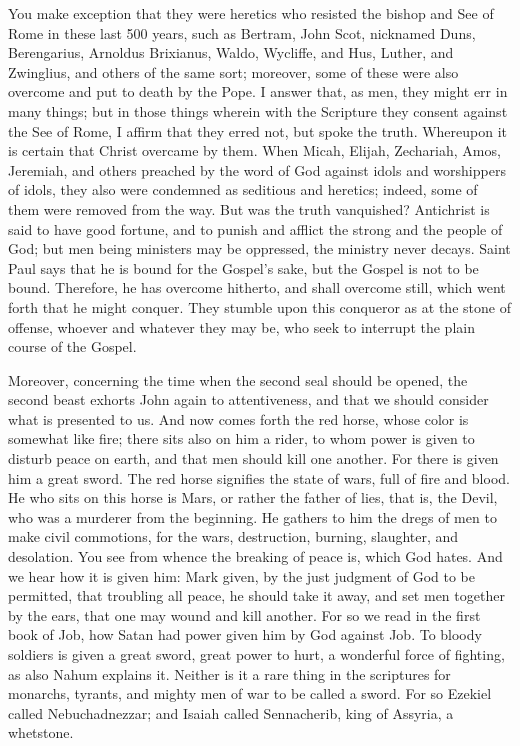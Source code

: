 You make exception that they were heretics who resisted the bishop and See of Rome in these last 500 years, such as Bertram, John Scot, nicknamed Duns, Berengarius, Arnoldus Brixianus, Waldo, Wycliffe, and Hus, Luther, and Zwinglius, and others of the same sort; moreover, some of these were also overcome and put to death by the Pope. I answer that, as men, they might err in many things; but in those things wherein with the Scripture they consent against the See of Rome, I affirm that they erred not, but spoke the truth. Whereupon it is certain that Christ overcame by them. When Micah, Elijah, Zechariah, Amos, Jeremiah, and others preached by the word of God against idols and worshippers of idols, they also were condemned as seditious and heretics; indeed, some of them were removed from the way. But was the truth vanquished? Antichrist is said to have good fortune, and to punish and afflict the strong and the people of God; but men being ministers may be oppressed, the ministry never decays. Saint Paul says that he is bound for the Gospel’s sake, but the Gospel is not to be bound. Therefore, he has overcome hitherto, and shall overcome still, which went forth that he might conquer. They stumble upon this conqueror as at the stone of offense, whoever and whatever they may be, who seek to interrupt the plain course of the Gospel.

Moreover, concerning the time when the second seal should be opened, the second beast exhorts John again to attentiveness, and that we should consider what is presented to us. And now comes forth the red horse, whose color is somewhat like fire; there sits also on him a rider, to whom power is given to disturb peace on earth, and that men should kill one another. For there is given him a great sword. The red horse signifies the state of wars, full of fire and blood. He who sits on this horse is Mars, or rather the father of lies, that is, the Devil, who was a murderer from the beginning. He gathers to him the dregs of men to make civil commotions, for the wars, destruction, burning, slaughter, and desolation. You see from whence the breaking of peace is, which God hates. And we hear how it is given him: Mark given, by the just judgment of God to be permitted, that troubling all peace, he should take it away, and set men together by the ears, that one may wound and kill another. For so we read in the first book of Job, how Satan had power given him by God against Job. To bloody soldiers is given a great sword, great power to hurt, a wonderful force of fighting, as also Nahum explains it. Neither is it a rare thing in the scriptures for monarchs, tyrants, and mighty men of war to be called a sword. For so Ezekiel called Nebuchadnezzar; and Isaiah called Sennacherib, king of Assyria, a whetstone.

